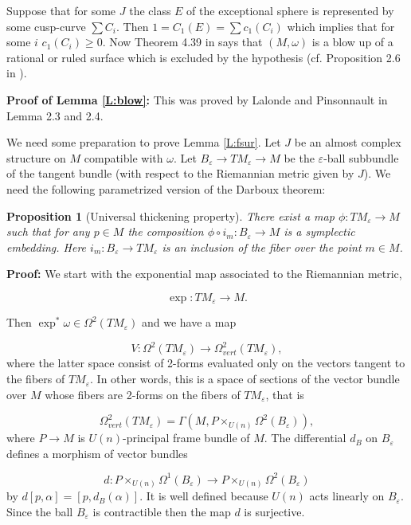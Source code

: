 \documentclass[a4paper,14pt]{article}
\newcommand{\al}{{\alpha}}
\newcommand{\Om}{{\Omega}}
\newcommand{\om}{{\omega}}
\newcommand{\eps}{{\varepsilon}}
\newcommand{\Ga}{{\Gamma}}
\newcommand{\qed}{\rightline {$\Box $}}
\newcommand{\Mo}{(M,\omega )}
\newcommand{\BS}{{\bigskip}}
\newcommand{\NI}{{\noindent}}
\newtheorem{prop}[theorem]{Proposition}
\numberwithin{equation}{section}
\numberwithin{figure}{section}
\begin{document}
Suppose that for some $J$ the class $E$ of the exceptional sphere
is represented by some cusp-curve $\sum C_i$. Then 
$1=C_1(E) = \sum c_1(C_i)$ which implies that for some $i$
$c_1(C_i)\geq 0$. Now Theorem 4.39 in \cite{ms} says that $\Mo $ is
a blow up of a rational or ruled surface which is excluded
by the hypothesis  (cf. Proposition 2.6 in \cite{lp}).

\qed


\BS
\NI
{\bf Proof of Lemma \ref{L:blow}:} This was proved by Lalonde
and Pinsonnault in \cite{lp}  Lemma 2.3 and 2.4.

\qed


\BS
\NI
We need some preparation to prove Lemma \ref{L:fsur}.
Let $J$ be an almost complex structure on $M$ compatible with $\om$.
Let $B_{\eps}\to TM_{\eps} \to M$ be the $\eps$-ball subbundle of the
tangent bundle (with respect to the Riemannian metric given by $J$).
We need the following parametrized version of the Darboux theorem:

\begin{prop}[Universal thickening property]\label{P:univ}
There exist a map $\phi : TM_{\eps}\to M$ such 
that for
any $p\in M$ the composition 
$\phi \circ i_m:B_{\eps}\to M$
is a symplectic embedding.
Here $i_m:B_{\eps}\to TM_{\eps}$
is an inclusion of the fiber over the point $m\in M$.
\end{prop}


\NI
{\bf Proof:}
We start with the exponential map
associated to the Riemannian metric,

$$
\exp:TM_{\eps}\to M.
$$

\NI
Then $\exp ^*\om \in \Om^2(TM_{\eps })$ and we have a map

$$
V:\Om^2(TM_{\eps})\to \Om^2_{vert}(TM_{\eps}),
$$
where the latter space consist of 2-forms evaluated only
on the vectors tangent to the fibers of $TM_{\eps}$.
In other words, this is a space of sections
of the vector bundle over $M$ whose
fibers are 2-forms on the fibers of $TM_{\eps}$, that is

$$
\Om^2_{vert}(TM_{\eps}) = \Ga (M,P\times _{U(n)} \Om^2(B_{\eps})),
$$
where $P\to M$ is $U(n)$-principal frame bundle of $M$.
The differential $d_B$ on $B_{\eps}$ defines a morphism
of vector bundles

$$
d:P\times _{U(n)} \Om^1(B_{\eps}) \to P\times _{U(n)} \Om^2(B_{\eps}) 
$$
by 
$d[p,\al ] = [p, d_B(\al )]$. It is well defined because
$U(n)$ acts linearly on $B_{\eps }$. Since the ball $B_{\eps}$
is contractible then the map $d$ is surjective.
\end{document}
